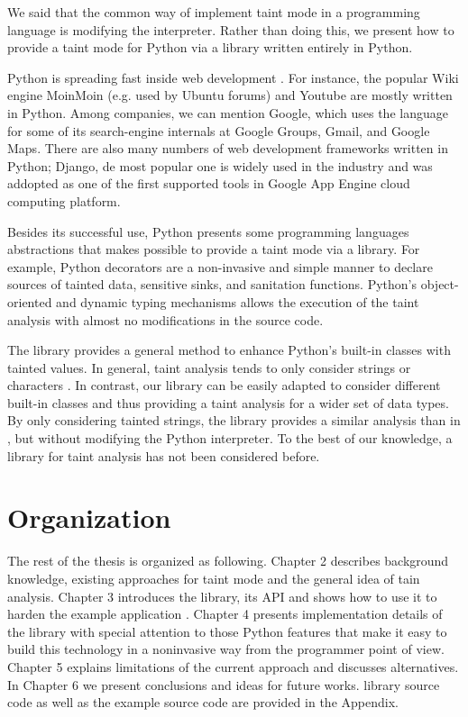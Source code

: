 We said that the common way of implement taint mode in a programming
language is modifying the interpreter. Rather than doing this,
we present how to provide
a taint mode for Python via a library written entirely in Python. 

Python is spreading fast inside
web development \cite{WikiPython}. 
For instance, 
the popular Wiki engine 
MoinMoin (e.g. used by Ubuntu forums)
and Youtube are mostly written in Python.  Among companies, 
we can mention Google, which uses 
the language for some of its search-engine internals at
Google Groups, Gmail, and Google Maps.
There are also many numbers of web development frameworks written
in Python; Django\cite{Django}, de most popular one is widely used
in the industry and was addopted as one of the first supported
tools in Google App Engine cloud computing platform.

Besides its successful use, Python presents 
some programming languages abstractions that makes possible 
to provide a taint mode via a library. For example, 
Python decorators \cite{Lutz:1999:LP} are a non-invasive and simple 
manner to declare sources of tainted data, sensitive sinks, and 
sanitation functions. Python's 
object-oriented and dynamic typing mechanisms allows the 
execution of the taint analysis with almost no modifications in the
source code. 

The library provides a general method to enhance Python's built-in
classes with tainted values. 
In general, taint
analysis tends to only consider strings or characters 
\cite{Perl,Nguyen05,Haldar05dynamictaint,KozlovPetukhov07,Futo07,SeoLam2010}.
In contrast, our library 
can be easily adapted to consider different built-in
classes
and thus providing a taint
analysis for a wider set of data types. 
By only considering tainted strings, the library provides 
a similar analysis than in \cite{KozlovPetukhov07},
but without modifying the Python interpreter.
To the best of our knowledge, a
library for taint analysis has not been considered before. 

\section{Organization}
The rest of the thesis is organized as following. Chapter 2 describes background
knowledge, existing approaches for taint mode and the general idea of tain analysis.
Chapter 3 introduces the library, its API and shows how to use it to harden
the example application \suggestions.
Chapter 4 presents implementation details of the library with special attention
to those Python features that make it easy to build this technology in a
noninvasive way from the programmer point of view.
Chapter 5 explains limitations of the current approach and discusses alternatives.
In Chapter 6 we present conclusions and ideas for future works.
library source code as well as the example source code are provided in the Appendix.
